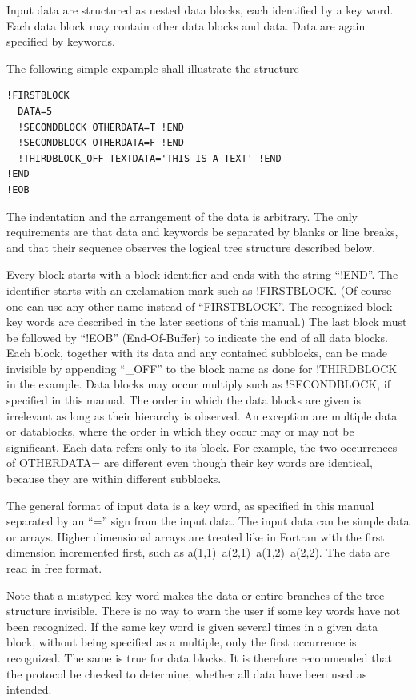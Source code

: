 \documentclass[final,12pt]{article}
\begin{document}
Input data are structured as nested data blocks, each identified
by a key word. Each data block may contain other data blocks and
data. Data are again specified by keywords.

The following simple expample shall illustrate the structure 
\begin{verbatim}
!FIRSTBLOCK
  DATA=5
  !SECONDBLOCK OTHERDATA=T !END
  !SECONDBLOCK OTHERDATA=F !END
  !THIRDBLOCK_OFF TEXTDATA='THIS IS A TEXT' !END
!END
!EOB
\end{verbatim}
The indentation and the arrangement of the data is arbitrary. The only
requirements are that data and keywords be separated by blanks or
line breaks, and that their sequence observes the logical tree structure
described below.

Every block starts with a block identifier and ends with the string
``!END''.  The identifier starts with an exclamation mark such as
!FIRSTBLOCK. (Of course one can use any other name instead of
``FIRSTBLOCK''. The recognized block key words are described in the
later sections of this manual.) The last block must be followed by
``!EOB'' (End-Of-Buffer) to indicate the end of all data blocks. Each
block, together with its data and any contained subblocks, can be
made invisible by appending ``\_OFF'' to the block name as done for
!THIRDBLOCK in the example. Data blocks may occur multiply such as
!SECONDBLOCK, if specified in this manual. The order in which the data
blocks are given is irrelevant as long as their hierarchy is observed.
An exception are multiple data or datablocks, where the order in
which they occur may or may not be significant.  Each data refers
only to its block. For example, the two occurrences of OTHERDATA=
are different even though their key words are identical, because they
are within different subblocks.

The general format of input data is a key word, as specified in this
manual separated by an ``='' sign from the input data.  The input data
can be simple data or arrays. Higher dimensional arrays are treated
like in Fortran with the first dimension incremented first, such as
a(1,1)\ a(2,1)\ a(1,2)\ a(2,2). The data are read in free format.

Note that a mistyped key word makes the data or entire branches of the
tree structure invisible. There is no way to warn the user if some key
words have not been recognized.  If the same key word is given several
times in a given data block, without being specified as a multiple,
only the first occurrence is recognized.  The same is true for data
blocks. It is therefore recommended that the protocol be checked to
determine, whether all data have been used as intended.
\end{document}
